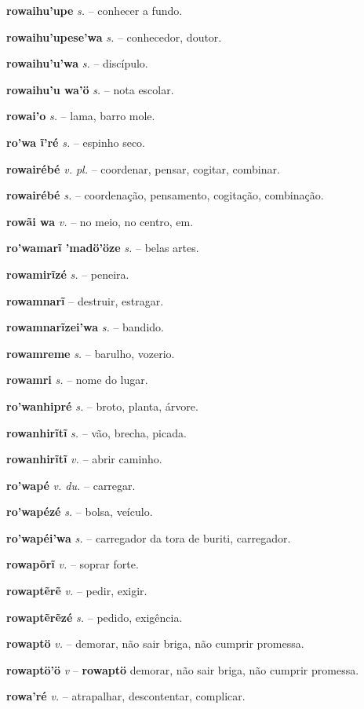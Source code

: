\textbf{rowaihu'upe} \textit{s.} -- conhecer a fundo.

\textbf{rowaihu'upese'wa} \textit{s.} -- conhecedor, doutor.

\textbf{rowaihu'u'wa} \textit{s.} -- discípulo.

\textbf{rowaihu'u wa'ö} \textit{s.} -- nota escolar.

\textbf{rowai'o} \textit{s.} -- lama, barro mole.

\textbf{ro'wa ĩ'ré} \textit{s.} -- espinho seco.

\textbf{rowairébé} \textit{v. pl.} -- coordenar, pensar, cogitar, combinar.

\textbf{rowairébé} \textit{s.} -- coordenação, pensamento, cogitação, combinação.

\textbf{rowãi wa} \textit{v.} -- no meio, no centro, em.

\textbf{ro'wamarĩ 'madö'öze} \textit{s.} -- belas artes.

\textbf{rowamirĩzé} \textit{s.} -- peneira.

\textbf{rowamnarĩ} \textit{} -- destruir, estragar.

\textbf{rowamnarĩzei'wa} \textit{s.} -- bandido.

\textbf{rowamreme} \textit{s.} -- barulho, vozerio.

\textbf{rowamri} \textit{s.} -- nome do lugar.

\textbf{ro'wanhipré} \textit{s.} -- broto, planta, árvore.

\textbf{rowanhirĩtĩ} \textit{s.} -- vão, brecha, picada.

\textbf{rowanhirĩtĩ} \textit{v.} -- abrir caminho.

\textbf{ro'wapé} \textit{v. du.} -- carregar.

\textbf{ro'wapézé} \textit{s.} -- bolsa, veículo.

\textbf{ro'wapéi'wa} \textit{s.} -- carregador da tora de buriti, carregador.

\textbf{rowapõrĩ} \textit{v.} -- soprar forte.

\textbf{rowaptẽrẽ} \textit{v.} -- pedir, exigir.

\textbf{rowaptẽrẽzé} \textit{s.} -- pedido, exigência.

\textbf{rowaptö} \textit{v.} -- demorar, não sair briga, não cumprir promessa.

\textbf{rowaptö'ö} \textit{v} -- \textbf{rowaptö} demorar, não sair briga, não cumprir promessa.

\textbf{rowa'ré} \textit{v.} -- atrapalhar, descontentar, complicar.

